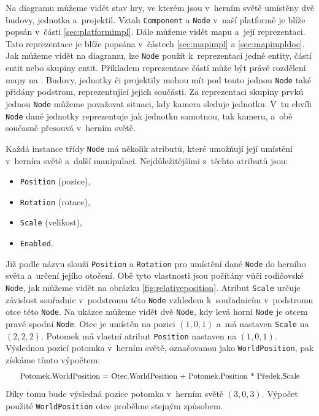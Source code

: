 Na diagramu můžeme vidět stav hry, ve kterém jsou v~herním světě umístěny dvě budovy, jednotka a~projektil. Vztah \texttt{Component} a \texttt{Node} v~naší platformě je blíže popsán v~části \ref{sec:platformimpl}. Dále můžeme vidět mapu a~její reprezentaci. Tato reprezentace je blíže popsána v~částech \ref{sec:mapimpl} a \ref{sec:mapimpldoc}. Jak můžeme vidět na diagramu, lze \texttt{Node} použít k~reprezentaci jedné entity, částí entit nebo skupiny entit. Příkladem reprezentace částí může být právě rozdělení mapy na . Budovy, jednotky či projektily mohou mít pod touto jednou \texttt{Node} také přidány podstrom, reprezentující jejich součásti. Za reprezentaci skupiny prvků jednou \texttt{Node} můžeme považovat situaci, kdy kamera sleduje jednotku. V~tu chvíli \texttt{Node} dané jednotky reprezentuje jak jednotku samotnou, tak kameru, a~obě současně přesouvá v~herním světě.



Každá instance třídy \texttt{Node} má několik atributů, které umožňují její umístění v~herním světě a~další manipulaci. Nejdůležitějšími z~těchto atributů jsou:

\begin{itemize}
	\item \texttt{Position} (pozice),
	\item \texttt{Rotation} (rotace),
	\item \texttt{Scale} (velikost),
	\item \texttt{Enabled}.
\end{itemize}

Již podle názvu slouží \texttt{Position} a \texttt{Rotation} pro umístění dané \texttt{Node} do herního světa a~určení jejího otočení. Obě tyto vlastnosti jsou počítány vůči rodičovské \texttt{Node}, jak můžeme vidět na obrázku \ref{fig:relativeposition}. Atribut \texttt{Scale} určuje závislost souřadnic v~podstromu této \texttt{Node} vzhledem k~souřadnicím v~podstromu otce této \texttt{Node}. Na ukázce můžeme vidět dvě \texttt{Node}, kdy levá horní \texttt{Node} je otcem pravé spodní \texttt{Node}. Otec je umístěn na pozici \((1,0,1)\) a~má nastaven \texttt{Scale} na \((2,2,2)\). Potomek má vlastní atribut \texttt{Position} nastaven na \((1,0,1)\). Výslednou pozicí potomka v~herním světě, označovanou jako \texttt{WorldPosition}, pak získáme tímto výpočtem:\[\scalebox{0.9}{Potomek.WorldPosition = Otec.WorldPosition + Potomek.Position * Předek.Scale}\] Díky tomu bude výsledná pozice potomka v~herním světě \((3,0,3)\). Výpočet použité \texttt{WorldPosition} otce proběhne stejným způsobem.


